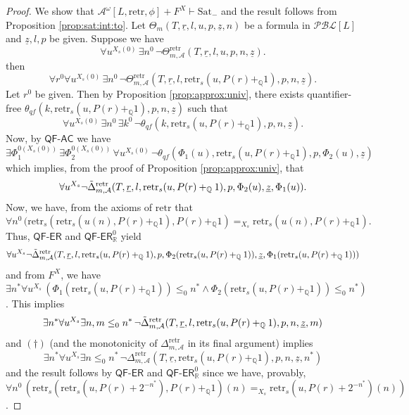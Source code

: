 \documentclass[10pt,a4paper]{amsart}
\def\QQ{\mathbb{Q}}
\def\RR{\mathbb{R}}
\newcommand{\QFAC}{\textsf{QF}\mbox{-}\textsf{AC}}
\newcommand{\QFER}{\textsf{QF}\mbox{-}\textsf{ER}}
\begin{document}
\begin{proof}
We show that $\mathcal{A}^\omega[L,\mathrm{retr},\phi]+F^X \vdash\mathrm{Sat}_{-}$ and the result follows from Proposition \ref{prop:sat:int:to}. Let $\Theta_m(T,\underline{r},l,u,p,\underline{z},n)$ be a formula in $\mathcal{PBL}[L]$ and $\underline{z},l,p$ be given. Suppose we have
    \[
  \forall u^{X_s(0)}\, \exists n^0\, \neg\Theta^\mathrm{retr}_{m,\mathcal{A}}(T,\underline{r},l,u,p,n,\underline{z}).
  \]
  then 
  \[
  \forall r^0 \forall u^{X_s(0)}\, \exists n^0\, \neg\Theta^\mathrm{retr}_{m,\mathcal{A}}(T,\underline{r},l,\mathrm{retr}_s(u,P(r)+_\QQ1),p,n,\underline{z}).  \]
 Let $r^0$ be given. Then by Proposition \ref{prop:approx:univ}, there exists quantifier-free $\theta_{qf}(k,\mathrm{retr}_s(u,P(r)+_\QQ1),p,n,\underline{z})$ such that 
   \[
  \forall u^{X_s(0)}\, \exists n^0\, \exists k^0\,\neg\theta_{qf}(k,\mathrm{retr}_s(u,P(r)+_\QQ1),p,n,\underline{z}).
  \]
  Now, by $\QFAC$ we have 
   \[
 \exists \Phi_1^{0(X_s(0))}\,\exists \Phi_2^{0(X_s(0))}\,\forall u^{X_s(0)}\,\neg\theta_{qf}(\Phi_1(u),\mathrm{retr}_s(u,P(r)+_\QQ1),p,\Phi_2(u),\underline{z})
  \]
  which implies, from the proof of Proposition \ref{prop:approx:univ}, that
     \[
 \forall u^{X_s}\neg \Tilde{\Delta}^\mathrm{retr}_{m,\mathcal{A}}(T,\underline{r},l,\mathrm{retr}_s(u,P(r)+_\QQ1),p,\Phi_2(u),\underline{z},\Phi_1(u)).
  \]
Now, we have, from the axioms of $\mathrm{retr}$ that 
\[
\forall n^0\, (\mathrm{retr}_s(\mathrm{retr}_s(u(n),P(r)+_\QQ1),P(r)+_\QQ1) =_{X_s} \mathrm{retr}_s(u(n),P(r)+_\QQ1).
\]
Thus, $\QFER$ and $\QFER^0_\RR$ yield
   \[
 \forall u^{X_s}\neg \Tilde{\Delta}^\mathrm{retr}_{m,\mathcal{A}}(T,\underline{r},l,\mathrm{retr}_s(u,P(r)+_\QQ1),p,\Phi_2(\mathrm{retr}_s(u,P(r)+_\QQ1)),\underline{z},\Phi_1(\mathrm{retr}_s(u,P(r)+_\QQ1)))
  \]
and from $F^X$, we have $\exists n^* \forall u^{X_s}\,(\Phi_1(\mathrm{retr}_s(u,P(r)+_\QQ1)) \le_0 n^*\land \Phi_2(\mathrm{retr}_s(u,P(r)+_\QQ1)) \le_0 n^*)$. This implies
\[
\exists n^* \forall u^{X_s} \exists n,m \le_0 n^*\,\neg \Tilde{\Delta}^\mathrm{retr}_{m,\mathcal{A}}(T,\underline{r},l,\mathrm{retr}_s(u,P(r)+_\QQ1),p,n,\underline{z},m)
\]
and $(\dagger)$ (and the monotonicity of $\Delta^\mathrm{retr}_{m,\mathcal{A}}$ in its final argument) implies 
\[
\exists n^* \forall u^{X_s} \exists n \le_0 n^*\,\neg \Delta^\mathrm{retr}_{m,\mathcal{A}}(T,\underline{r},\mathrm{retr}_s(u,P(r)+_\QQ1),p,n,\underline{z},n^*)
\]
and the result follows by $\QFER$ and $\QFER^0_\RR$ since we have, provably, $\forall n^0\,(\mathrm{retr}_s(\mathrm{retr}_s(u,P(r)+2^{-n^*}),P(r)+_\QQ1)(n) =_{X_s} \mathrm{retr}_s(u,P(r)+2^{-n^*})(n))$.               
\end{proof}
\end{document}
